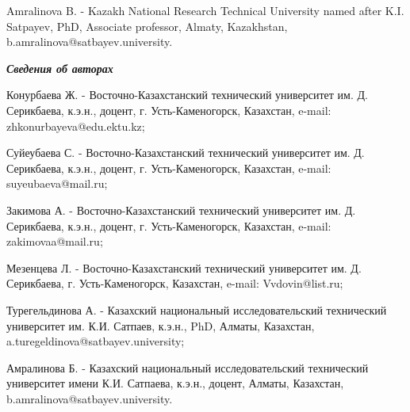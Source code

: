 Amralinova B. - Kazakh National Research Technical University named
after K.I. Satpayev, PhD, Associate professor, Almaty, Kazakhstan,
b.amralinova@satbayev.university.

\emph{{\bfseries Сведения об авторах}}

Конурбаева Ж. - Восточно-Казахстанский технический университет им. Д.
Серикбаева, к.э.н., доцент, г. Усть-Каменогорск, Казахстан, e-mail:
zhkonurbayeva@edu.ektu.kz;

Суйеубаева С. - Восточно-Казахстанский технический университет им. Д.
Серикбаева, к.э.н., доцент, г. Усть-Каменогорск, Казахстан, e-mail:
suyeubaeva@mail.ru;

Закимова А. - Восточно-Казахстанский технический университет им. Д.
Серикбаева, к.э.н., доцент, г. Усть-Каменогорск, Казахстан, e-mail:
zakimovaa@mail.ru;

Мезенцева Л. - Восточно-Казахстанский технический университет им. Д.
Серикбаева, г. Усть-Каменогорск, Казахстан, e-mail: Vvdovin@list.ru;

Турегельдинова А. - Казахский национальный исследовательский технический
университет им. К.И. Сатпаев, к.э.н., PhD, Алматы, Казахстан,
a.turegeldinova@satbayev.university;

Амралинова Б. - Казахский национальный исследовательский технический
университет имени К.И. Сатпаева, к.э.н., доцент, Алматы, Казахстан,
b.amralinova@satbayev.university.




